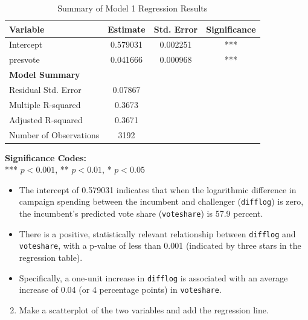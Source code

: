 \documentclass[12pt,letterpaper]{article}
\begin{document}
\begin{table}[h!]
	\centering
	\caption{Summary of Model 1 Regression Results}
	\vspace{0.25cm}
	\begin{tabular}{lccc}
		\toprule
		\textbf{Variable} & \textbf{Estimate} & \textbf{Std. Error} & \textbf{Significance} \\ 
		\midrule
		Intercept              & 0.579031 & 0.002251 & *** \\ 
		presvote               & 0.041666 & 0.000968 & *** \\ 
		\midrule
		\textbf{Model Summary} & & & \\
		Residual Std. Error    & 0.07867  & & \\ 
		Multiple R-squared     & 0.3673   & & \\ 
		Adjusted R-squared     & 0.3671   & & \\ 
		Number of Observations & 3192     & & \\ 
		\bottomrule
	\end{tabular}
\end{table}

\vspace{0.1cm}
\noindent\textbf{Significance Codes:} \\
*** $p < 0.001$, ** $p < 0.01$, * $p < 0.05$
	
\vspace{0.5cm} \begin{itemize}[left=0pt, label=\textbullet]
\item The intercept of 0.579031 indicates that when the logarithmic difference in campaign spending between the incumbent and challenger (\texttt{difflog}) is zero, the incumbent's predicted vote share (\texttt{voteshare}) is 57.9 percent.
\item There is a positive, statistically relevant relationship between \texttt{difflog} and \texttt{voteshare}, with a p-value of less than 0.001 (indicated by three stars in the regression table).
\item Specifically, a one-unit increase in \texttt{difflog} is associated with an average increase of 0.04 (or 4 percentage points) in \texttt{voteshare}. 
\end{itemize}

\newpage
	\begin{enumerate}[left=0pt]
	\setcounter{enumi}{1}
		\item Make a scatterplot of the two variables and add the regression line.
	\end{enumerate}
\end{document}
